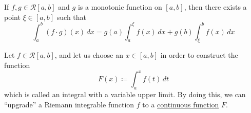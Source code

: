   \begin{theorem}
    \label{thm:bonnets-formula}
    If $f, g \in \mathcal{R}[a, b]$ and $g$ is a monotonic function on $[a, b]$, then there exists a point $\xi \in [a, b]$ such that
    \begin{equation}
      \int_a^b (f \cdot g) (x)\,dx = g(a) \int_a^\xi f(x)\,dx + g(b) \int_\xi^b f(x)\,dx
    \end{equation}
  \end{theorem}

  Let $f \in \mathcal{R}[a, b]$, and let us choose an $x \in [a, b]$ in order to construct the function
  \begin{equation}
    F(x) \coloneqq \int_a^x f(t)\,dt
  \end{equation}
  which is called an integral with a variable upper limit. By doing this, we can ``upgrade'' a Riemann integrable function $f$ to a \hyperref[pst-def:continuous_func]{continuous function} $F$. 


